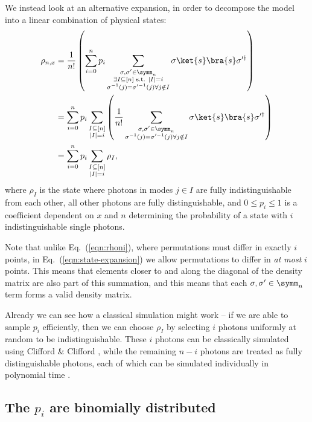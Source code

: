 We instead look at an alternative expansion, in order to decompose the model into a linear combination of physical states:
\begin{align}
\rho_{n,x} &= \frac{1}{n!}\left(\sum_{i=0}^np_i\sum_{\substack{\sigma,\sigma'\in\symm_n\\\exists I\subseteq [n] \textrm{ s.t. } |I|=i\\\sigma^{-1}(j)=\sigma'^{-1}(j)\forall j \notin I}}\sigma\ket{s}\bra{s}\sigma'^\dagger\right)\label{eqn:state-expansion}\\
&= \sum_{i=0}^np_i\sum_{\substack{I\subseteq[n]\\|I|=i}}\left(\frac{1}{n!}\sum_{\substack{\sigma,\sigma'\in\symm_n\\\sigma^{-1}(j)=\sigma'^{-1}(j)\forall j \notin I}}\sigma\ket{s}\bra{s}\sigma'^\dagger\right)\\
&= \sum_{i=0}^np_i\sum_{\substack{I\subseteq[n]\\|I|=i}}\rho_I, \label{eq:newrho}
\end{align}
where $\rho_I$ is the state where photons in modes $j \in I$ are fully indistinguishable from each other, all other photons are fully distinguishable, and $0 \leq p_i \leq 1$ is a coefficient dependent on $x$ and $n$ determining the probability of a state with $i$ indistinguishable single photons.

Note that unlike Eq.\ (\ref{eqn:rhoni}), where permutations must differ in exactly $i$ points, in Eq.\ (\ref{eqn:state-expansion}) we allow permutations to differ in \emph{at most} $i$ points. 
This means that elements closer to and along the diagonal of the density matrix are also part of this summation, and this means that each $\sigma,\sigma' \in \symm_n$ term forms a valid density matrix.

Already we can see how a classical simulation might work -- if we are able to sample $p_i$ efficiently, then we can choose $\rho_I$ by selecting $i$ photons uniformly at random to be indistinguishable. 
These $i$ photons can be classically simulated using Clifford \& Clifford \cite{clifford2017}, while the remaining $n-i$ photons are treated as fully distinguishable photons, each of which can be simulated individually in polynomial time \cite{aaronson2014,neville2017}.


\subsection{The $p_i$ are binomially distributed}
\label{sec:understanding-pi}

